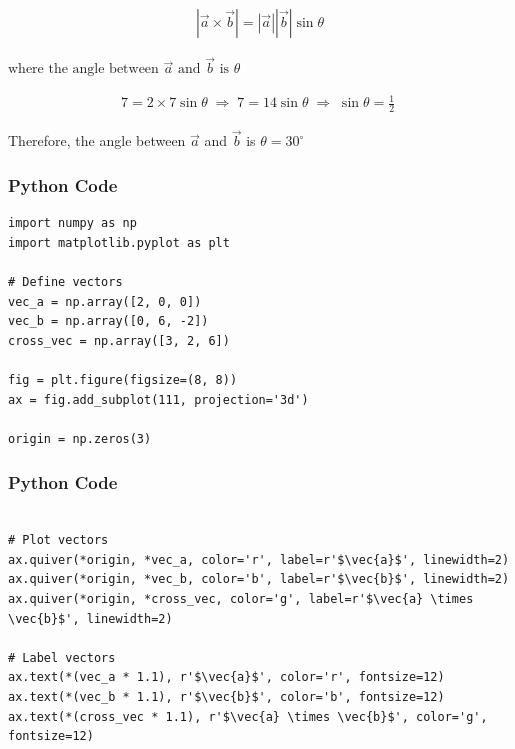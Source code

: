 \documentclass{beamer}
\begin{document}
\begin{align}
|\vec{a} \times \vec{b}| = |\vec{a}| |\vec{b}| \sin\theta
\end{align}

\hspace{3cm}$\text{where the angle between } \vec{a} \text{ and } \vec{b} \text{ is } \theta$


\begin{align}
7 = 2 \times 7 \sin\theta \;\Rightarrow\;
7 = 14 \sin\theta \;\Rightarrow\;
\sin\theta = \tfrac{1}{2} \;
\end{align}

\vspace{2cm}

\hspace{2cm} Therefore, the angle between $\vec{a}$ and $\vec{b}$ is $\theta = 30^\circ$


\begin{frame}[fragile]
    \frametitle{Python Code}
    \begin{lstlisting}
import numpy as np
import matplotlib.pyplot as plt

# Define vectors
vec_a = np.array([2, 0, 0])
vec_b = np.array([0, 6, -2])
cross_vec = np.array([3, 2, 6])

fig = plt.figure(figsize=(8, 8))
ax = fig.add_subplot(111, projection='3d')

origin = np.zeros(3)

     \end{lstlisting}
\end{frame}


\begin{frame}[fragile]
    \frametitle{Python Code}
    \begin{lstlisting}
    
# Plot vectors
ax.quiver(*origin, *vec_a, color='r', label=r'$\vec{a}$', linewidth=2)
ax.quiver(*origin, *vec_b, color='b', label=r'$\vec{b}$', linewidth=2)
ax.quiver(*origin, *cross_vec, color='g', label=r'$\vec{a} \times \vec{b}$', linewidth=2)

# Label vectors
ax.text(*(vec_a * 1.1), r'$\vec{a}$', color='r', fontsize=12)
ax.text(*(vec_b * 1.1), r'$\vec{b}$', color='b', fontsize=12)
ax.text(*(cross_vec * 1.1), r'$\vec{a} \times \vec{b}$', color='g', fontsize=12)

     \end{lstlisting}
\end{frame}
\end{document}
